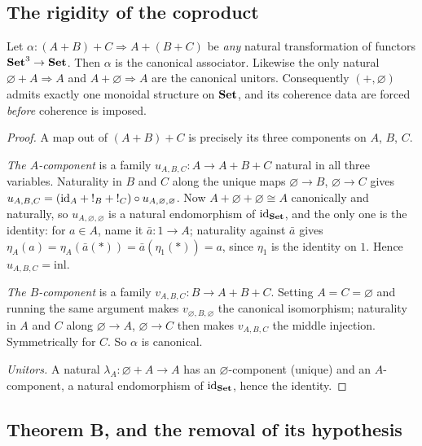 \subsection{The rigidity of the coproduct}

\begin{Lemma}[Rigidity]\label{lem:rigidity}
Let $\alpha\colon (A+B)+C\Rightarrow A+(B+C)$ be \emph{any} natural
transformation of functors $\mathbf{Set}^3\to\mathbf{Set}$. Then $\alpha$ is the canonical
associator. Likewise the only natural $\varnothing+A\Rightarrow A$ and
$A+\varnothing\Rightarrow A$ are the canonical unitors. Consequently
$(+,\varnothing)$ admits exactly one monoidal structure on $\mathbf{Set}$, and its
coherence data are forced \emph{before} coherence is imposed.
\end{Lemma}

\begin{proof}
A map out of $(A+B)+C$ is precisely its three components on $A$, $B$, $C$.

\emph{The $A$-component} is a family $u_{A,B,C}\colon A\to A+B+C$ natural in all
three variables. Naturality in $B$ and $C$ along the unique maps
$\varnothing\to B$, $\varnothing\to C$ gives
$u_{A,B,C}=(\mathrm{id}_A+{!}_B+{!}_C)\circ u_{A,\varnothing,\varnothing}$. Now
$A+\varnothing+\varnothing\cong A$ canonically and naturally, so
$u_{A,\varnothing,\varnothing}$ is a natural endomorphism of $\mathrm{id}_{\mathbf{Set}}$, and
the only one is the identity: for $a\in A$, name it $\bar a\colon 1\to A$;
naturality against $\bar a$ gives
$\eta_A(a)=\eta_A(\bar a(\ast))=\bar a(\eta_1(\ast))=a$, since $\eta_1$ is the
identity on $1$. Hence $u_{A,B,C}=\mathrm{inl}$.

\emph{The $B$-component} is a family $v_{A,B,C}\colon B\to A+B+C$. Setting
$A=C=\varnothing$ and running the same argument makes
$v_{\varnothing,B,\varnothing}$ the canonical isomorphism; naturality in $A$ and
$C$ along $\varnothing\to A$, $\varnothing\to C$ then makes $v_{A,B,C}$ the
middle injection. Symmetrically for $C$. So $\alpha$ is canonical.

\emph{Unitors.} A natural $\lambda_A\colon\varnothing+A\to A$ has an
$\varnothing$-component (unique) and an $A$-component, a natural endomorphism of
$\mathrm{id}_{\mathbf{Set}}$, hence the identity.
\end{proof}

\subsection{Theorem B, and the removal of its hypothesis}


